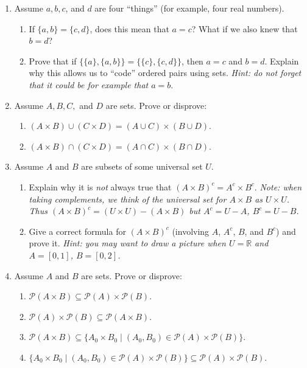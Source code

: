 \documentclass{amsart}
\theoremstyle{definition}
\begin{document}
\begin{enumerate}
\item Assume $a, b, c$, and $d$ are four ``things'' (for example, four real numbers).
  \begin{enumerate}
  \item If $\{a, b\} = \{c, d\}$, does this mean that $a = c$? What if we also knew that $b = d$?
  \item Prove that if $\{\{a\}, \{a, b\}\} = \{\{c\}, \{c, d\}\}$, then $a = c$ and $b = d$. Explain why this allows us to ``code'' ordered pairs using sets. \emph{Hint: do not forget that it could be for example that $a = b$}.
  \end{enumerate}
\item Assume $A, B, C, $ and $D$ are sets. Prove or disprove:

  \begin{enumerate}
    \item $(A \times B) \cup (C \times D) = (A \cup C) \times (B \cup D)$.
    \item $(A \times B) \cap (C \times D) = (A \cap C) \times (B \cap D)$.
  \end{enumerate}
\item Assume $A$ and $B$ are subsets of some universal set $U$.
  \begin{enumerate}
  \item Explain why it is \emph{not} always true that $(A \times B)^c = A^c \times B^c$. \emph{Note: when taking complements, we think of the universal set for $A \times B$ as $U \times U$. Thus $(A \times B)^c = (U \times U) - (A \times B)$ but $A^c = U - A$, $B^c = U - B$.}
  \item Give a correct formula for $(A \times B)^c$ (involving $A$, $A^c$, $B$, and $B^c$) and prove it. \emph{Hint: you may want to draw a picture when $U = \mathbb{R}$ and $A = [0,1]$, $B = [0,2]$.}
  \end{enumerate}
\item Assume $A$ and $B$ are sets. Prove or disprove:
  \begin{enumerate}
  \item $\mathcal{P} (A \times B) \subseteq \mathcal{P} (A) \times \mathcal{P} (B)$.
  \item $\mathcal{P} (A) \times \mathcal{P} (B) \subseteq \mathcal{P} (A \times B)$.
  \item $\mathcal{P} (A \times B) \subseteq \{A_0 \times B_0 \mid (A_0, B_0) \in \mathcal{P} (A) \times \mathcal{P} (B)\}$.
  \item $\{A_0 \times B_0 \mid (A_0, B_0) \in \mathcal{P} (A) \times \mathcal{P} (B)\} \subseteq \mathcal{P} (A) \times \mathcal{P} (B)$.
  \end{enumerate}
\end{enumerate}



\end{document}
